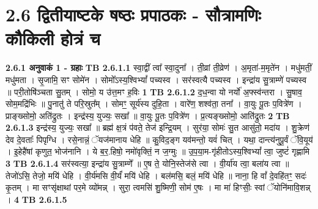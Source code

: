 \documentclass[17pt]{extarticle}
\begin{document}
     \section*{ 2.6     द्वितीयाष्टके षष्ठः प्रपाठकः - सौत्रामणिः कौकिली होत्रं च }
                \textbf{ 2.6.1      अनुवाकं   1 - ग्रहाः} \newline
                                \textbf{ TB 2.6.1.1} \newline
                  स्वा॒द्वीं त्वा᳚ स्वा॒दुना᳚ । ती॒व्रां ती॒व्रेण॑ । अ॒मृता॑-म॒मृते॑न । मधु॑मतीं॒ मधु॑मता । सृ॒जामि॒ सꣳ सोमे॑न । सोमो᳚ऽस्य॒श्विभ्यां᳚ पच्यस्व । सर॑स्वत्यै पच्यस्व । इन्द्रा॑य सु॒त्राम्णे॑ पच्यस्व ॥ परी॒तोषि॑ञ्चता सु॒तम् । सोमो॒ य उ॑त्त॒मꣳ ह॒विः \textbf{ 1} \newline
                  \newline
                                \textbf{ TB 2.6.1.2} \newline
                  द॒ध॒न्वा यो नर्यो॑ अ॒फ्स्व॑न्तरा । सु॒षाव॒ सोम॒मद्रि॑भिः ॥ पु॒नातु॑ ते परि॒स्रुत᳚म् । सोमꣳ॒॒ सूर्य॑स्य दुहि॒ता । वारे॑ण॒ शश्व॑ता॒ तना᳚ । वा॒युः पू॒तः प॒वित्रे॑ण । प्राङ्ख्सोमो॒ अति॑द्रुतः । इन्द्र॑स्य॒ युज्यः॒ सखा᳚ ॥ वा॒युः पू॒तः प॒वित्रे॑ण । प्र॒त्यङ्ख्सोमो॒ आति॑द्रुतः \textbf{ 2} \newline
                  \newline
                                \textbf{ TB 2.6.1.3} \newline
                  इन्द्र॑स्य॒ युज्यः॒ सखा᳚ ॥ ब्रह्म॑ क्ष॒त्रं प॑वते॒ तेज॑ इन्द्रि॒यम् । सुर॑या॒ सोमः॑ सु॒त आसु॑तो॒ मदा॑य । शु॒क्रेण॑ देव दे॒वताः᳚ पिपृग्धि । रसे॒नान्नं॒ ॅयज॑मानाय धेहि ॥ कु॒विद॒ङ्ग यव॑मन्तो॒ यवं॑ चित् । यथा॒ दान्त्य॑नुपू॒र्वं ॅवि॒यूय॑ । इ॒हेहै॑षां कृणुत॒ भोज॑नानि । ये ब॒र॒.हिषो॒ नमो॑वृक्तिं॒ न ज॒ग्मुः ॥ उ॒प॒या॒म-गृ॑हीतोऽस्य॒श्विभ्यां᳚ त्वा॒ जुष्टं॑ गृह्णामि \textbf{ 3} \newline
                  \newline
                                \textbf{ TB 2.6.1.4} \newline
                  सर॑स्वत्या॒ इन्द्रा॑य सु॒त्राम्णे᳚ ॥ ए॒ष ते॒ योनि॒स्तेज॑से त्वा । वी॒र्या॑य त्वा॒ बला॑य त्वा ॥ तेजो॑ऽसि॒ तेजो॒ मयि॑ धेहि । वी॒र्य॑मसि वी॒र्यं॑ मयि॑ धेहि । बल॑मसि॒ बलं॒ मयि॑ धेहि ॥ नाना॒ हि वां᳚ दे॒वहि॑तꣳ॒॒ सदः॑ कृ॒तम् । मा सꣳसृ॑क्षाथां पर॒मे व्यो॑मन्न् । सुरा॒ त्वमसि॑ शु॒ष्मिणी॒ सोम॑ ए॒षः । मा मा॑ हिꣳसीः॒ स्वां ॅयोनि॑मावि॒शन्न् । \textbf{ 4} \newline
                  \newline
                                \textbf{ TB 2.6.1.5} \newline
\end{document}
